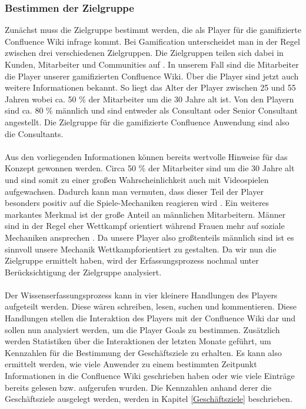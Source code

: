 \documentclass[a4paper,12pt,twoside]{scrartcl}
\begin{document}
\subsubsection{Bestimmen der Zielgruppe}
\label{Zielgruppe}
Zunächst muss die Zielgruppe bestimmt werden, die als Player für die gamifizierte Confluence Wiki infrage kommt. Bei Gamification unterscheidet man in der Regel zwischen drei verschiedenen Zielgruppen. Die Zielgruppen teilen sich dabei in Kunden, Mitarbeiter und Communities auf \cite{gamificationDefinition}. In unserem Fall sind die Mitarbeiter die Player unserer gamifizierten Confluence Wiki. Über die Player sind jetzt auch weitere Informationen bekannt. So liegt das Alter der Player zwischen 25 und 55 Jahren wobei ca. 50 \% der Mitarbeiter um die 30 Jahre alt ist. Von den Playern sind ca. 80 \% männlich und sind entweder als Consultant oder Senior Consultant angestellt. Die Zielgruppe für die gamifizierte Confluence Anwendung sind also die Consultants. 
\\\\
Aus den vorliegenden Informationen können bereits wertvolle Hinweise für das Konzept gewonnen werden. Circa 50 \% der Mitarbeiter sind um die 30 Jahre alt und sind somit zu einer großen Wahrscheinlichkeit auch mit Videospielen aufgewachsen. Dadurch kann man vermuten, dass dieser Teil der Player besonders positiv auf die Spiele-Mechaniken reagieren wird \cite{Persona2018}. Ein weiteres markantes Merkmal ist der große Anteil an männlichen Mitarbeitern. Männer sind in der Regel eher Wettkampf orientiert während Frauen mehr auf soziale Mechaniken ansprechen \cite{Persona2018}. Da unsere Player also großtenteils männlich sind ist es sinnvoll unsere Mechanik Wettkampforientiert zu gestalten. Da wir nun die Zielgruppe ermittelt haben, wird der Erfassungsprozess nochmal unter Berücksichtigung der Zielgruppe analysiert.
\\\\
Der Wissenserfassungsprozess kann in vier kleinere Handlungen des Players aufgeteilt werden. Diese wären schreiben, lesen, suchen und kommentieren. Diese Handlungen stellen die Interaktion des Players mit der Confluence Wiki dar und sollen nun analysiert werden, um die Player Goals zu bestimmen. Zusätzlich werden Statistiken über die Interaktionen der letzten Monate geführt, um Kennzahlen für die Bestimmung der Geschäftsziele zu erhalten. Es kann also ermittelt werden, wie viele Anwender zu einem bestimmten Zeitpunkt Informationen in die Confluence Wiki geschrieben haben oder wie viele Einträge bereits gelesen bzw. aufgerufen wurden. Die Kennzahlen anhand derer die Geschäftsziele ausgelegt werden, werden in Kapitel \ref{Geschäftsziele} beschrieben.
\end{document}
